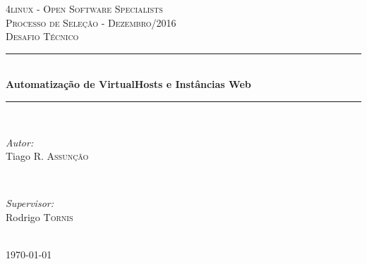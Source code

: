 \documentclass[12pt]{article}
\begin{document}
\begin{titlepage}

    \newcommand{\HRule}{\rule{\linewidth}{0.5mm}} %

        \center %


        \textsc{\LARGE 4linux - Open Software Specialists}\\[1.5cm] %
        \textsc{\Large Processo de Seleção - Dezembro/2016}\\[0.5cm] %
        \textsc{\large Desafio Técnico}\\[0.5cm] %


        \HRule \\[0.4cm]
        { \huge \bfseries Automatização de VirtualHosts e Instâncias Web}\\[0.4cm] %
        \HRule \\[1.5cm]


        \begin{minipage}{0.4\textwidth}
            \begin{flushleft} \large
                \emph{Autor:}\\
                Tiago R. \textsc{Assunção} %
            \end{flushleft}

        \end{minipage}
        ~
        \begin{minipage}{0.4\textwidth}
            \begin{flushright} \large
                \emph{Supervisor:} \\
                Rodrigo \textsc{Tornis} %
            \end{flushright}
        \end{minipage}\\[2cm]
        {\large \today}\\[2cm] %
        \vfill %
\end{titlepage}
\end{document}
